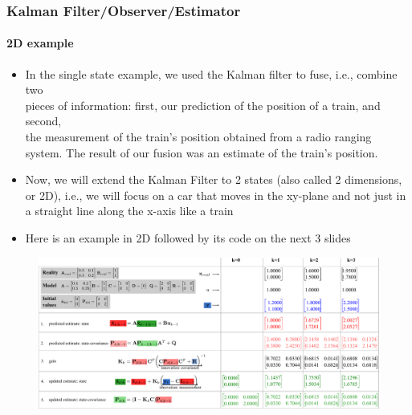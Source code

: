 \documentclass{beamer}
\newenvironment{changemargin}[2]
	{
	  	\begin{list}{}
		{
			\setlength{\topsep}{0pt}%
			\setlength{\leftmargin}{#1}%
			\setlength{\rightmargin}{#2}%
			\setlength{\listparindent}{\parindent}%
			\setlength{\itemindent}{\parindent}%
			\setlength{\parsep}{\parskip}%
		}
	  	\item[]
		}
		{\end{list}
	}
\begin{document}
\begin{frame}[plain]
\frametitle{Kalman Filter/Observer/Estimator}
\framesubtitle{2D example}

\begin{changemargin}{-1.4in}{0in}
\scriptsize
\begin{itemize}
\item In the single state example, we used the Kalman filter to fuse, i.e., combine two\\ pieces of information: first, our prediction of the position of a train, and second,\\ the measurement of the train's position obtained from a radio ranging system.  The result of our fusion was an estimate of the train's position.
\item Now, we will extend the Kalman Filter to 2 states (also called 2 dimensions, or 2D), i.e., we will focus on a car that moves in the xy-plane and not just in a straight line along the x-axis like a train
\item Here is an example in 2D followed by its code on the next 3 slides
\end{itemize}
\vspace{-0.18in}
\begin{figure}[h]
\centering
\includegraphics[width=1.4\textwidth]{figs/TRK_KalmanFilter_example.pdf}
\end{figure}
\end{changemargin}
\end{frame}
\end{document}
